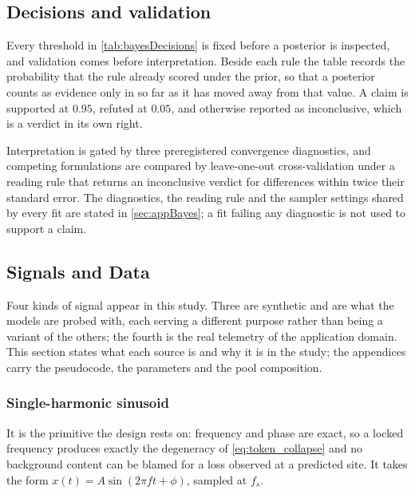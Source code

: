 \subsection{Decisions and validation}

Every threshold in \autoref{tab:bayesDecisions} is fixed before a posterior is inspected, and validation comes before interpretation. Beside each rule the table records the probability that the rule already scored under the prior, so that a posterior counts as evidence only in so far as it has moved away from that value. A claim is supported at $0.95$, refuted at $0.05$, and otherwise reported as inconclusive, which is a verdict in its own right.

Interpretation is gated by three preregistered convergence diagnostics, and competing formulations are compared by leave-one-out cross-validation under a reading rule that returns an inconclusive verdict for differences within twice their standard error. The diagnostics, the reading rule and the sampler settings shared by every fit are stated in \autoref{sec:appBayes}; a fit failing any diagnostic is not used to support a claim.
\endgroup

\subsection{Signals and Data}\label{sec:four}
\begingroup
\let\subsection\subsubsection
Four kinds of signal appear in this study. Three are synthetic and are what the models are probed with, each serving a different purpose rather than being a variant of the others; the fourth is the real telemetry of the application domain. This section states what each source is and why it is in the study; the appendices carry the pseudocode, the parameters and the pool composition.

\subsection*{Single-harmonic sinusoid}

It is the primitive the design rests on: frequency and phase are exact, so a locked frequency produces exactly the degeneracy of \autoref{eq:token_collapse} and no background content can be blamed for a loss observed at a predicted site. It takes the form $x(t)=A\sin(2\pi f t+\phi)$, sampled at $f_s$.

